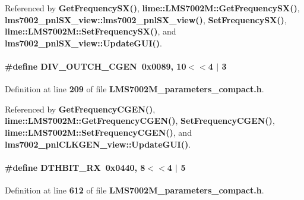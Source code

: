 Referenced by {\bf Get\+Frequency\+S\+X()}, {\bf lime\+::\+L\+M\+S7002\+M\+::\+Get\+Frequency\+S\+X()}, {\bf lms7002\+\_\+pnl\+S\+X\+\_\+view\+::lms7002\+\_\+pnl\+S\+X\+\_\+view()}, {\bf Set\+Frequency\+S\+X()}, {\bf lime\+::\+L\+M\+S7002\+M\+::\+Set\+Frequency\+S\+X()}, and {\bf lms7002\+\_\+pnl\+S\+X\+\_\+view\+::\+Update\+G\+U\+I()}.

\paragraph[{D\+I\+V\+\_\+\+O\+U\+T\+C\+H\+\_\+\+C\+G\+EN}]{\setlength{\rightskip}{0pt plus 5cm}\#define D\+I\+V\+\_\+\+O\+U\+T\+C\+H\+\_\+\+C\+G\+EN~0x0089, 10$<$$<$4 $\vert$  3}\label{LMS7002M__parameters__compact_8h_a281c4033da66c948264a68620fd0a4e7}


Definition at line {\bf 209} of file {\bf L\+M\+S7002\+M\+\_\+parameters\+\_\+compact.\+h}.



Referenced by {\bf Get\+Frequency\+C\+G\+E\+N()}, {\bf lime\+::\+L\+M\+S7002\+M\+::\+Get\+Frequency\+C\+G\+E\+N()}, {\bf Set\+Frequency\+C\+G\+E\+N()}, {\bf lime\+::\+L\+M\+S7002\+M\+::\+Set\+Frequency\+C\+G\+E\+N()}, and {\bf lms7002\+\_\+pnl\+C\+L\+K\+G\+E\+N\+\_\+view\+::\+Update\+G\+U\+I()}.

\paragraph[{D\+T\+H\+B\+I\+T\+\_\+\+RX}]{\setlength{\rightskip}{0pt plus 5cm}\#define D\+T\+H\+B\+I\+T\+\_\+\+RX~0x0440, 8$<$$<$4 $\vert$  5}\label{LMS7002M__parameters__compact_8h_a6393836a503022d35d94498de136b1ba}


Definition at line {\bf 612} of file {\bf L\+M\+S7002\+M\+\_\+parameters\+\_\+compact.\+h}.



